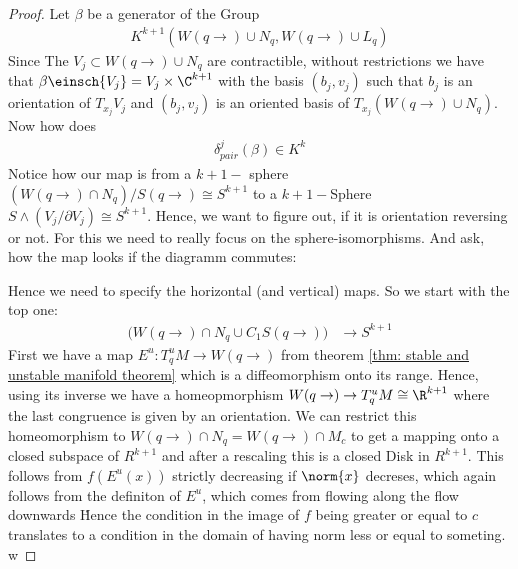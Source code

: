 \begin{proof}
 Let $\beta$ be a generator of the Group 
 \begin{align*}
     K^{k+1}(W(q\to)\cup N_q,W(q\to)\cup L_q)
 \end{align*} Since The $V_j\subset W(q\to)\cup N_q$ are contractible, without restrictions we have that $\beta\einsch{V_j}=V_j\times \C^{k+1}$ with the basis $(b_j,v_j)$ such that $b_j$ is an orientation of $T_{x_j}V_j$ and $(b_j,v_j)$ is an oriented basis of $T_{x_j} (W(q\to)\cup N_q)$. Now how does 
 \begin{align*}
     \delta^j_{pair} (\beta)\in K^{k}
 \end{align*}
Notice how our map is from a $k+1-$ sphere $(W(q\to)\cap N_q)\big/ S(q\to )\cong S^{k+1}$ to a $k+1-$Sphere $S\wedge (V_j\big/ \partial V_j)\cong S^{k+1}$. Hence, we want to figure out, if it is orientation reversing or not. For this we need to really focus on the sphere-isomorphisms. And ask, how the map looks if the diagramm commutes:
\begin{center}
\end{center}
Hence we need to specify the horizontal (and vertical) maps. 
So we start with the top one:
\begin{align*}
	\big(W(q\to )\cap N_q \cup C_1 S(q\to ) \big)& \to S^{k+1}
\end{align*}
First we have a map $E^u:T^u_qM \to W(q\to)$ from theorem \ref{thm: stable and unstable manifold theorem} which is a diffeomorphism onto its range. Hence, using its inverse we have a homeopmorphism $W(q \to) \to T^u_qM \cong \R^{k+1}$ where the last congruence is given by an orientation. We can restrict this homeomorphism to $W(q\to)\cap N_q=W(q\to)\cap M_c$ to get a mapping onto a closed subspace of $R^{k+1}$ and after a rescaling this is a closed Disk in $R^{k+1}$. This follows from $f(E^u(x))$ strictly decreasing if $\norm{x}$ decreses, which again follows from the definiton of $E^u$, which comes from \glqq flowing along the flow downwards \grqq\. Hence the condition in the image of $f$ being greater or equal to $c$ translates to a condition in the domain of having norm less or equal to someting. w




\end{proof}
